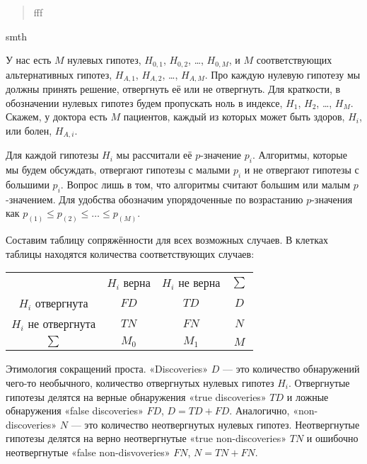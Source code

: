 \documentclass[12pt]{article}
\begin{document}
\begin{verse}
    \begin{flushright}
fff
    \end{flushright}
\end{verse}


\begin{tcolorbox}[colback=yellow!50!red!25!white]
smth
\end{tcolorbox}


У нас есть $M$ нулевых гипотез, $H_{0, 1}$, $H_{0, 2}$, \dots, $H_{0, M}$, и $M$ соответствующих альтернативных гипотез,
$H_{A, 1}$, $H_{A, 2}$, \dots, $H_{A, M}$. 
Про каждую нулевую гипотезу мы должны принять решение, отвергнуть её или не отвергнуть. 
Для краткости, в обозначении нулевых гипотез будем пропускать ноль в индексе, $H_1$, $H_2$, \dots, $H_M$.
Скажем, у доктора есть $M$ пациентов, каждый из которых может быть здоров, $H_i$, или болен, $H_{A,i}$.

Для каждой гипотезы $H_i$ мы рассчитали её $p$-значение $p_i$. 
Алгоритмы, которые мы будем обсуждать, отвергают гипотезы с малыми $p_i$ и не отвергают гипотезы с большими $p_i$.
Вопрос лишь в том, что алгоритмы считают большим или малым $p$-значением. 
Для удобства обозначим упорядоченные по возрастанию $p$-значения как $p_{(1)} \leq p_{(2)} \leq \dots \leq p_{(M)}$.

Составим таблицу сопряжённости для всех возможных случаев. 
В клетках таблицы находятся количества соответствующих случаев:

\begin{tabular}{cccc}
    \toprule
    & $H_i$ верна & $H_i$ не верна & $\sum$ \\
    $H_i$ отвергнута & $FD$ & $TD$  & $D$ \\
    $H_i$ не отвергнута & $TN$ & $FN$  & $N$ \\
    \midrule
    $\sum$ & $M_0$ & $M_1$ & $M$ \\
    \bottomrule
\end{tabular}

Этимология сокращений проста. 
«Discoveries» $D$ — это количество обнаружений чего-то необычного, количество отвергнутых нулевых гипотез $H_i$.
Отвергнутые гипотезы делятся на верные обнаружения «true discoveries» $TD$ и ложные обнаружения «false discoveries» $FD$, $D = TD + FD$.
Аналогично, «non-discoveries» $N$ — это количество неотвергнутых нулевых гипотез. 
Неотвергнутые гипотезы делятся на верно неотвергнутые «true non-discoveries» $TN$ и ошибочно неотвергнутые «false non-disvoveries» $FN$, $N = TN + FN$.
\end{document}

